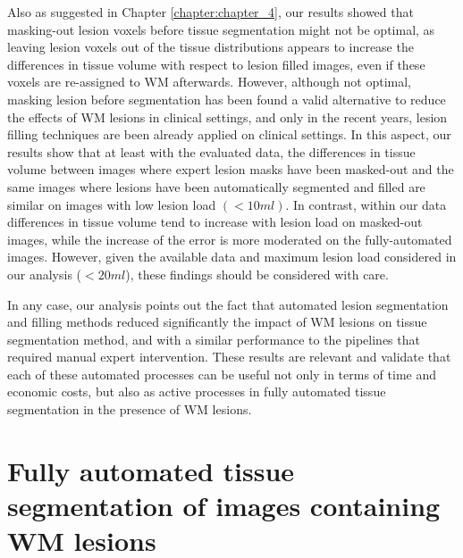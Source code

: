 Also as suggested in Chapter \ref{chapter:chapter_4}, our results showed that masking-out lesion voxels before tissue segmentation might not be optimal, as leaving lesion voxels out of the tissue distributions appears to increase the differences in tissue volume with respect to lesion filled images, even if these voxels are re-assigned to WM afterwards. However, although not optimal, masking lesion before segmentation has been found a valid alternative to reduce the effects of WM lesions in clinical settings, and only in the recent years, lesion filling techniques are been already applied on clinical settings. In this aspect, our results show that at least with the evaluated data, the differences in tissue volume between images where expert lesion masks have been masked-out and the same images where lesions have been automatically segmented and filled are similar on images with low lesion load $(<10ml)$. In contrast, within our data differences in tissue volume tend to increase with lesion load on masked-out images, while the increase of the error is more moderated on the fully-automated images. However, given the available data and maximum lesion load considered in our analysis ($<20ml$), these findings should be considered with care. 

In any case, our analysis points out the fact that automated lesion segmentation and filling methods reduced significantly the impact of WM lesions on tissue segmentation method, and with a similar performance to the pipelines that required manual expert intervention. These results are relevant and validate that each of these automated processes can be useful not only in terms of time and economic costs, but also as active processes in fully automated tissue segmentation in the presence of WM lesions.

\section{Fully automated tissue segmentation of images containing WM lesions}
\label{sec:label}

